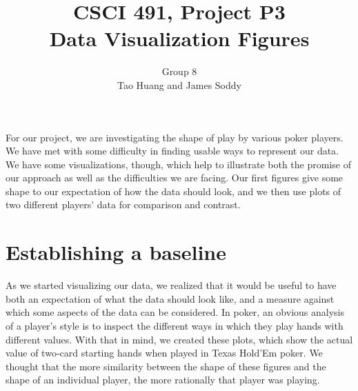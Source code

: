 \documentclass[12pt]{article}
\title{CSCI 491, Project P3\\
		\small{Data Visualization Figures}}
\author{Group 8\\
		\small{Tao Huang and James Soddy}}
\begin{document}
\maketitle

For our project, we are investigating the shape of play by various poker players. We have
met with some difficulty in finding usable ways to represent our data. We have some visualizations,
though, which help to illustrate both the promise of our approach as well as the difficulties we
are facing. Our first figures give some shape to our expectation of how the data should look,
and we then use plots of two different players' data for comparison and contrast.

\newpage
\section*{Establishing a baseline}

As we started visualizing our data, we realized that it would be useful to have both an
expectation of what the data should look like, and a measure against which some aspects of
the data can be considered. In poker, an obvious analysis of a player's style is to
inspect the different ways in which they play hands with different values. With that in mind, we
created these plots, which show the actual value of two-card starting hands when played in
Texas Hold'Em poker. We thought that the more similarity between the shape of these figures
and the shape of an individual player, the more rationally that player was playing.
\end{document}
